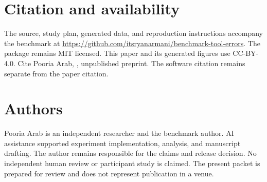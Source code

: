\documentclass{article}
\begin{document}
\section{Citation and availability}
The source, study plan, generated data, and reproduction instructions accompany the benchmark at \url{https://github.com/itsryanarmani/benchmark-tool-errors}. The package remains MIT licensed. This paper and its generated figures use CC-BY-4.0. Cite Pooria Arab, \emph{\PaperTitle}, unpublished preprint. The software citation remains separate from the paper citation.\par
\section{Authors}
Pooria Arab is an independent researcher and the benchmark author. AI assistance supported experiment implementation, analysis, and manuscript drafting. The author remains responsible for the claims and release decision. No independent human review or participant study is claimed. The present packet is prepared for review and does not represent publication in a venue.\par


\end{document}
